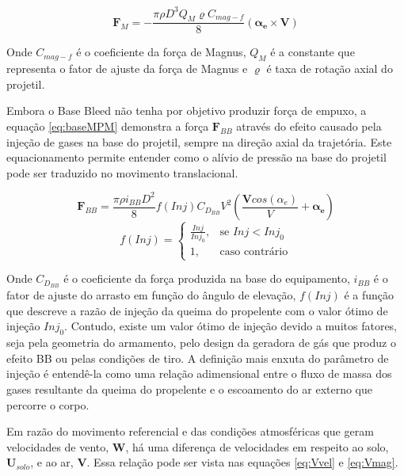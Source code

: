 \begin{equation}
    \label{eq:magnusMPM}
    \boldsymbol{F}_{M} = -\frac{\pi \rho D^{3} Q_{M} \varrho C_{mag-f}}{8}(\boldsymbol{\alpha_{e}} \times \boldsymbol{V})
\end{equation}

Onde $C_{mag-f}$ é o coeficiente da força de Magnus, $Q_{M}$ é a constante que representa o fator de ajuste da força de Magnus e $\varrho$ é taxa de rotação axial do projetil.

Embora o Base Bleed não tenha por objetivo produzir força de empuxo, a equação \ref{eq:baseMPM} demonstra a força $\textbf{F}_{BB}$ através do efeito causado pela injeção de gases na base do projetil, sempre na direção axial da trajetória. Este equacionamento permite entender como o alívio de pressão na base do projetil pode ser traduzido no movimento translacional.

\begin{equation} \label{eq:baseMPM}
    \boldsymbol{F}_{BB} = \frac{\pi \rho i_{BB} D^{2}}{8} f(Inj) C_{D_{BB}}V^{2} \left(\frac{\boldsymbol{V}cos(\alpha_{e})}{V} +\boldsymbol{\alpha_{e}}\right)
\end{equation}
%
\begin{equation}
f(Inj) =\begin{cases}
			\frac{Inj}{Inj_{0}}, & \text{se $Inj < Inj_{0}$}\\
            1, & \text{caso contrário}
		 \end{cases}
\end{equation}

Onde $C_{D_{BB}}$ é o coeficiente da força produzida na base do equipamento, $i_{BB}$ é o fator de ajuste do arrasto em função do ângulo de elevação, $f(Inj)$ é a função que descreve a razão de injeção da queima do propelente com o valor ótimo de injeção $Inj_{0}$. Contudo, existe um valor ótimo de injeção devido a muitos fatores, seja pela geometria do armamento, pelo design da geradora de gás que produz o efeito BB ou pelas condições de tiro. A definição mais enxuta do parâmetro de injeção é entendê-la como uma relação adimensional entre o fluxo de massa dos gases resultante da queima do propelente e o escoamento do ar externo que percorre o corpo.

Em razão do movimento referencial e das condições atmosféricas que geram velocidades de vento, $\boldsymbol{W}$, há uma diferença de velocidades em respeito ao solo, $\boldsymbol{U}_{solo}$, e ao ar, $\boldsymbol{V}$. Essa relação pode ser vista nas equações \ref{eq:Vvel} e \ref{eq:Vmag}.


